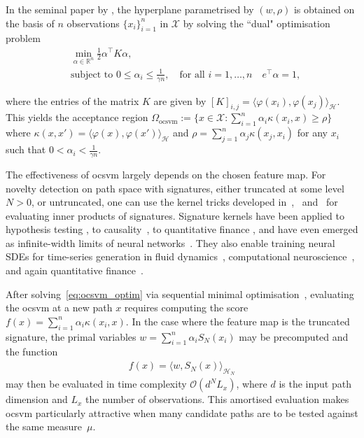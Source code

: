 \documentclass[twoside,11pt]{article}
\numberwithin{equation}{section}
\numberwithin{theorem}{section}
\newcommand{\R}{\mathbb{R}}
\newcommand{\X}{\mathcal{X}}
\newcommand{\h}{\mathcal{H}}
\newcommand{\Oo}{\mathcal{O}}
\begin{document}
In the seminal paper by \cite{scholkopf2001estimating}, the hyperplane parametrised by $(w,\rho)$ is obtained on the basis of $n$ observations $\{x_i\}_{i=1}^{n}$ in $\X$ by solving the ``dual" optimisation problem 
\begin{align}\label{eq:ocsvm_optim}
    &\min_{\alpha\in \R^n}\frac{1}{2}\alpha^\top K \alpha, \\
     &\text{subject to } 0\leq \alpha_i \leq \frac{1}{\gamma n}, \quad\text{for all }i=1,\ldots, n\quad e^\top \alpha =1,
\end{align}

where the entries of the matrix $K$ are given by $[K]_{i,j}=\langle \varphi(x_i),\varphi(x_j)\rangle_{\h}$. This yields the acceptance region $\Omega_{\mathrm{ocsvm}} := \{x\in\X: \sum_{i=1}^{n}\alpha_i\kappa(x_i,x)\geq \rho\}$ where $\kappa(x,x')=\langle \varphi(x),\varphi(x')\rangle_{\h}$ and $\rho=\sum_{j=1}^{n}\alpha_j\kappa(x_j,x_i)$ for any $x_i$ such that $0<\alpha_i<\frac{1}{\gamma n}$. 

The effectiveness of \gls{ocsvm} largely depends on the chosen feature map. For novelty detection on path space with signatures, either truncated at some level $N>0$, or untruncated, one can use the kernel tricks developed in~\cite{kiraly2019kernels},~\cite{salvi2021signature} and~\cite{cirone2023neural} for evaluating inner products of signatures. Signature kernels have been applied to hypothesis testing \citep{salvi2021higher, lemercier2021distribution, horvath2023optimal}, to causality~\citep{mantensignature}, to quantitative finance \citep{pannier2024path, cirone2025rough}, and have even emerged as infinite-width limits of neural networks~\citep{cirone2023neural}. They also enable training neural SDEs for time-series generation in fluid dynamics~\citep{salvi2022neural}, computational neuroscience~\citep{holberg2024exact}, and again quantitative finance~\citep{issa2023non, diaz2023neural, hoglund2023neural}.

After solving~\eqref{eq:ocsvm_optim} via sequential minimal optimisation~\citep{chang2011libsvm}, evaluating the \gls{ocsvm} at a new path \(x\) requires computing the score $f(x)=\sum_{i=1}^n \alpha_i \kappa(x_i,x)$. In the case where the feature map is the truncated signature, the primal variables \(w=\sum_{i=1}^n \alpha_i S_N(x_i)\) may be precomputed and the function 
\begin{align*}
    f(x) = \langle w, S_N(x)\rangle_{\h_N}  
\end{align*} 
may then be evaluated in time complexity \(\Oo(d^NL_x)\), where \(d\) is the input path dimension and $L_x$ the number of observations. This amortised evaluation makes \gls{ocsvm} particularly attractive when many candidate paths are to be tested against the same measure~$\mu$.
\end{document}
